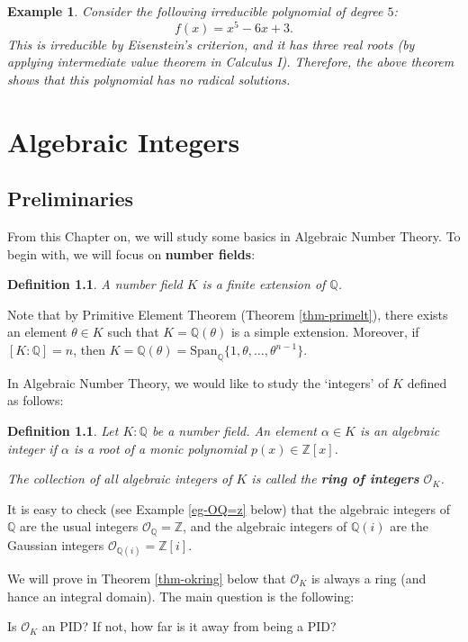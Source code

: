 \documentclass[11pt]{book}
\newtheorem{definition}[theorem]{Definition}
\newtheorem{example}[theorem]{Example}
\begin{document}
\begin{example} 
Consider the following irreducible polynomial of degree $5$:
$$ f(x) = x^5 - 6x + 3. $$
This is irreducible by Eisenstein's criterion, and it has three real roots (by applying intermediate value theorem in Calculus I). Therefore, the above theorem shows that this polynomial has no radical solutions.
\end{example}


\chapter{Algebraic Integers}
\section{Preliminaries}
From this Chapter on, we will study some basics in Algebraic Number Theory. To begin with, we will focus on {\bf number fields}:
\begin{definition}
A number field $K$ is a finite extension of $\mathbb{Q}$.
\end{definition}
Note that by Primitive Element Theorem (Theorem \ref{thm-primelt}), there exists an element $\theta \in K$ such that $K = \mathbb{Q}(\theta)$ is a simple extension. Moreover, 
if $[K : \mathbb{Q}] = n$, then
    $K = \mathbb{Q}(\theta) = \mathrm{Span}_{\mathbb{Q}}\{1, \theta, \ldots, \theta^{n-1}\}$.

In Algebraic Number Theory, we would like to study the `integers' of $K$ defined as follows: 
\begin{definition}
    Let $K:\mathbb{Q}$ be a number field. An element $\alpha \in K$ is an {\it algebraic integer} if $\alpha$ is a root of a monic polynomial $p(x) \in \mathbb{Z}[x]$.

    The collection of all algebraic integers of $K$ is called the {\bf ring of integers} $\mathcal{O}_K$.
\end{definition}
It is easy to check (see Example \ref{eg-OQ=z} below) that the algebraic integers of $\mathbb{Q}$ are the usual integers $\mathcal{O}_{\mathbb{Q}} = \mathbb{Z}$, and the algebraic integers of $\mathbb{Q}(i)$ are the Gaussian integers $\mathcal{O}_{\mathbb{Q}(i)} = \mathbb{Z}[i]$. 

We will prove in Theorem \ref{thm-okring} below that $\mathcal{O}_K$ is always a ring (and hance an integral domain). The main question is the following:
\begin{center}
    Is $\mathcal{O}_K$ an PID? If not, how far is it away from being a PID?
\end{center}
\end{document}
